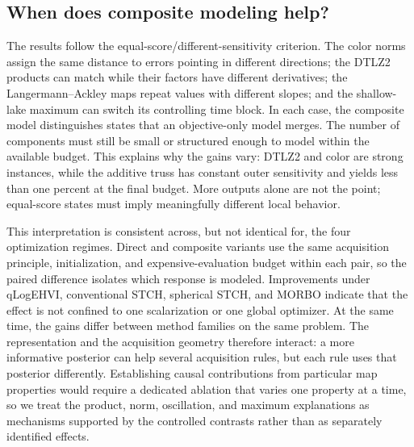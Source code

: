 \documentclass{article}
\begin{document}
\subsection{When does composite modeling help?}
\label{sec:discussion}

The results follow the equal-score/different-sensitivity criterion.  The color
norms assign the same distance to errors pointing in different directions;
the DTLZ2 products can match while their factors have different derivatives;
the Langermann--Ackley maps repeat values with different slopes; and the
shallow-lake maximum can switch its controlling time block.  In each case, the
composite model distinguishes states that an objective-only model merges.  The
number of components must still be small or structured enough to model within
the available budget.  This explains why the gains vary: DTLZ2 and color are
strong instances, while the additive truss has constant outer sensitivity and
yields less than one percent at the final budget.  More outputs
alone are not the point; equal-score states must imply meaningfully different
local behavior.

This interpretation is consistent across, but not identical for, the four
optimization regimes.  Direct and composite variants use the same acquisition
principle, initialization, and expensive-evaluation budget within each pair,
so the paired difference isolates which response is modeled.  Improvements
under qLogEHVI, conventional STCH, spherical STCH, and MORBO indicate that the
effect is not confined to one scalarization or one global optimizer.  At the
same time, the gains differ between method families on the same problem.  The
representation and the acquisition geometry therefore interact: a more
informative posterior can help several acquisition rules, but each rule uses
that posterior differently.  Establishing causal contributions from
particular map properties would require a dedicated ablation that varies one
property at a time, so we treat the product, norm, oscillation, and maximum
explanations as mechanisms supported by the controlled contrasts rather than
as separately identified effects.
\end{document}
